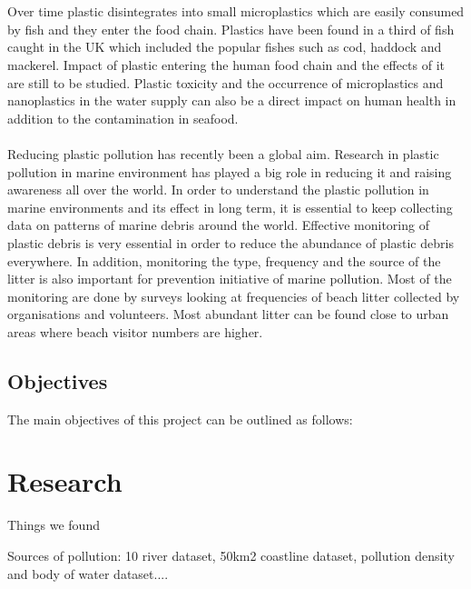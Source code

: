 \documentclass[10pt]{article}\usepackage[]{graphicx}\usepackage[]{color}
\begin{document}
\\
\\
Over time plastic disintegrates into small microplastics which are easily consumed by fish and they enter the food chain. Plastics have been found in a third of fish caught in the UK which included the popular fishes such as cod, haddock and mackerel. Impact of plastic entering the human food chain and the effects of it are still to be studied.  Plastic toxicity and the occurrence of microplastics and nanoplastics in the water supply can also be a direct impact on human health in addition to the contamination in seafood.\cite{ROCHMAN2015} \cite{MARKIC2020}
\\
\\
Reducing plastic pollution has recently been a global aim. Research in plastic pollution in marine environment has played a big role in reducing it and raising awareness all over the world. In order to understand the plastic pollution in marine environments and its effect in long term, it is essential to keep collecting data on patterns of marine debris around the world. Effective monitoring of plastic debris is very essential in order to reduce the abundance of plastic debris everywhere. In addition, monitoring the type, frequency and the source of the litter is also important for prevention initiative of marine pollution. Most of the monitoring are done by surveys looking at frequencies of beach litter collected by organisations and volunteers.\cite{COE1997} Most abundant litter can be found close to urban areas where beach visitor numbers are higher.\cite{GARRITY1993} 






\subsection{Objectives }\label{obj}

The main objectives of this project can be outlined as follows: 



\pagebreak
\section{Research}\label{research}

Things we found

Sources of pollution: 10 river dataset, 50km2 coastline dataset, pollution density and body of water dataset....

\pagebreak
\end{document}
